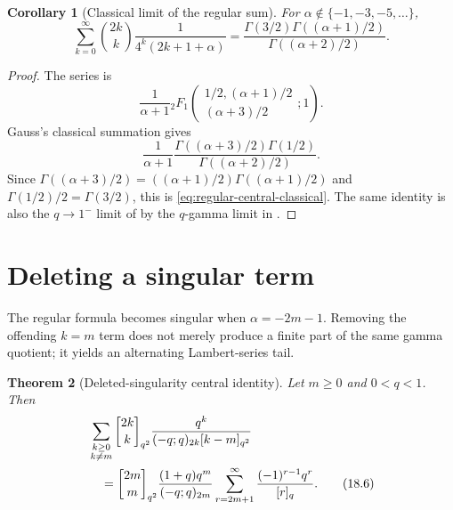 \documentclass[11pt,oneside,openany]{book}
\newtheorem{theorem}{Theorem}[chapter]
\newtheorem{corollary}[theorem]{Corollary}
\theoremstyle{definition}
\theoremstyle{remark}
\newcommand{\Qbinom}[3]{\genfrac{[}{]}{0pt}{}{#1}{#2}_{#3}}
\begin{document}
\begin{corollary}[Classical limit of the regular sum]\label{cor:regular-central-classical}
For $\alpha\notin\{-1,-3,-5,\ldots\}$,
\[
 \sum_{k=0}^{\infty}\binom{2k}{k}
 \frac1{4^k(2k+1+\alpha)}
 =\frac{\Gamma(3/2)\Gamma((\alpha+1)/2)}
        {\Gamma((\alpha+2)/2)}.
 \tag{18.5}\label{eq:regular-central-classical}
\]
\end{corollary}

\begin{proof}
The series is
\[
 \frac1{\alpha+1}
 {}_2F_1\!\left(
 \begin{matrix}1/2,(\alpha+1)/2\\(\alpha+3)/2\end{matrix};1\right).
\]
Gauss's classical summation gives
\[
 \frac1{\alpha+1}
 \frac{\Gamma((\alpha+3)/2)\Gamma(1/2)}
      {\Gamma((\alpha+2)/2)}.
\]
Since $\Gamma((\alpha+3)/2)=((\alpha+1)/2)\Gamma((\alpha+1)/2)$ and $\Gamma(1/2)/2=\Gamma(3/2)$, this is \eqref{eq:regular-central-classical}.  The same identity is also the $q\to1^-$ limit of  by the $q$-gamma limit in .
\end{proof}

\section{Deleting a singular term}

The regular formula becomes singular when $\alpha=-2m-1$.  Removing the offending $k=m$ term does not merely produce a finite part of the same gamma quotient; it yields an alternating Lambert-series tail.

\begin{theorem}[Deleted-singularity central identity]\label{thm:singular-central}
Let $m\ge0$ and $0<q<1$.  Then
\begin{align}
 &\sum_{\substack{k\ge0\\k\ne m}}
 \Qbinom{2k}{k}{q^2}
 \frac{q^k}{(-q;q)_{2k}[k-m]_{q^2}}
 \notag\\
 &\quad=
 \Qbinom{2m}{m}{q^2}
 \frac{(1+q)q^m}{(-q;q)_{2m}}
 \sum_{r=2m+1}^{\infty}
 \frac{(-1)^{r-1}q^r}{[r]_q}.
 \tag{18.6}\label{eq:singular-central}
\end{align}
\end{theorem}
\end{document}
